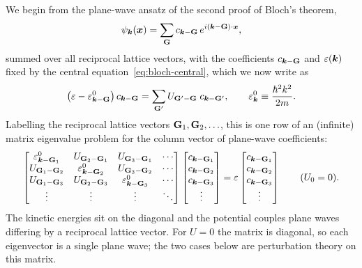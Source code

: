 We begin from the plane-wave ansatz of the second proof of Bloch's theorem,
\begin{equation}
    \psi_{\lvect{k}}(\lvect{x}) = \sum_{\cvect{G}} c_{\lvect{k}-\cvect{G}}\, e^{i(\lvect{k}-\cvect{G})\cdot\lvect{x}},
\end{equation}
summed over all reciprocal lattice vectors, with the coefficients $c_{\lvect{k}-\cvect{G}}$ and $\varepsilon(\bm{k})$ fixed by the central equation~\eqref{eq:bloch-central}, which we now write as
\begin{equation}
    \bigl(\varepsilon - \varepsilon^0_{\lvect{k}-\cvect{G}}\bigr)\, c_{\lvect{k}-\cvect{G}}
    = \sum_{\cvect{G}'} U_{\cvect{G}'-\cvect{G}}\; c_{\lvect{k}-\cvect{G}'},
    \qquad \varepsilon^0_{\lvect{k}} \equiv \frac{\hbar^2 k^2}{2m}.
    \label{eq:bloch-central-eps}
\end{equation}
Labelling the reciprocal lattice vectors $\cvect{G}_1,\cvect{G}_2,\ldots$, this is one row of an (infinite) matrix eigenvalue problem for the column vector of plane-wave coefficients:
\begin{equation}
    \begin{bmatrix}
        \varepsilon^0_{\lvect{k}-\cvect{G}_1} & U_{\cvect{G}_2-\cvect{G}_1} & U_{\cvect{G}_3-\cvect{G}_1} & \cdots \\
        U_{\cvect{G}_1-\cvect{G}_2} & \varepsilon^0_{\lvect{k}-\cvect{G}_2} & U_{\cvect{G}_3-\cvect{G}_2} & \cdots \\
        U_{\cvect{G}_1-\cvect{G}_3} & U_{\cvect{G}_2-\cvect{G}_3} & \varepsilon^0_{\lvect{k}-\cvect{G}_3} & \cdots \\
        \vdots & \vdots & \vdots & \ddots
    \end{bmatrix}
    \begin{bmatrix} c_{\lvect{k}-\cvect{G}_1} \\ c_{\lvect{k}-\cvect{G}_2} \\ c_{\lvect{k}-\cvect{G}_3} \\ \vdots \end{bmatrix}
    = \varepsilon
    \begin{bmatrix} c_{\lvect{k}-\cvect{G}_1} \\ c_{\lvect{k}-\cvect{G}_2} \\ c_{\lvect{k}-\cvect{G}_3} \\ \vdots \end{bmatrix}
    \qquad (U_0=0).
\end{equation}
The kinetic energies sit on the diagonal and the potential couples plane waves differing by a reciprocal lattice vector. For $U=0$ the matrix is diagonal, so each eigenvector is a single plane wave; the two cases below are perturbation theory on this matrix.
